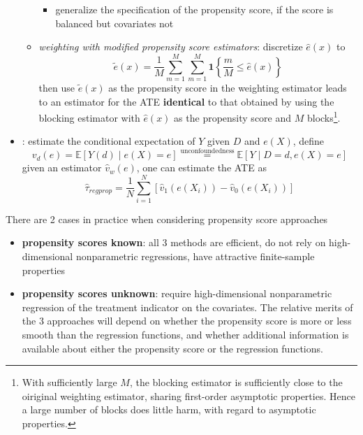 \documentclass[twoside]{article}
\begin{document}
\begin{itemize}
\begin{itemize}
\begin{itemize}
            \item generalize the specification of the propensity score, if the score is balanced but covariates not
        \end{itemize}
        \item \textit{weighting with modified propensity score estimators}: discretize $\hat{e}(x)$ to 
        \begin{equation*}
            \tilde{e}(x) = \frac{1}{M} \sum^M_{m=1} \sum^M_{m=1} \mathbf{1} \left\{ \frac{m}{M} \leq \hat{e}(x) \right\}
        \end{equation*}
        then use $\tilde{e}(x)$ as the propensity score in the weighting estimator leads to an estimator for the ATE \textbf{identical} to that obtained by using the blocking estimator with $\hat{e}(x)$ as the propensity score and $M$ blocks\footnote{With sufficiently large $M$, the blocking estimator is sufficiently close to the oiriginal weighting estimator, sharing first-order asymptotic properties. Hence a large number of blocks does little harm, with regard to asymptotic properties.}. 
    \end{itemize}
    \item {}: estimate the conditional expectation of $Y$ given $D$ and $e(X)$, define $$ v_d(e) = \mathbb{E}\left[ Y(d) \mid e(X)=e \right] \overset{\text{unconfoundedness}}{=} \mathbb{E}\left[Y \mid D=d, e(X)=e\right] $$
    given an estimator $\hat{v}_w(e)$, one can estimate the ATE as 
    \begin{equation*}
        \hat{\tau}_{regprop} = \frac{1}{N} \sum^N_{i=1} \left[ \hat{v}_1\left(e(X_i)\right) - \hat{v}_0 \left(e(X_i)\right) \right]
    \end{equation*}
\end{itemize}

There are 2 cases in practice when considering propensity score approaches
\begin{itemize}
    \item \textbf{propensity scores known}: all 3 methods are efficient, do not rely on high-dimensional nonparametric regressions, have attractive finite-sample properties
    \item \textbf{propensity scores unknown}: require high-dimensional nonparametric regression of the treatment indicator on the covariates. The relative merits of the 3 approaches will depend on whether the propensity score is more or less smooth than the regression functions, and whether additional information is available about either the propensity score or the regression functions.
\end{itemize}
\end{document}

